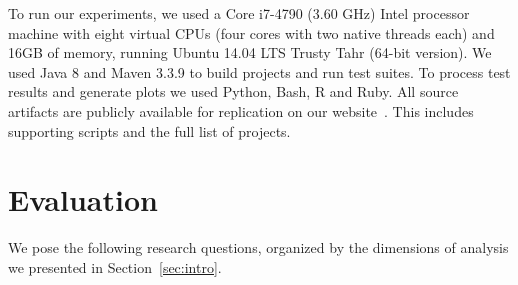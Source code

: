 \documentclass[10pt,journal,compsoc]{IEEEtran}
\begin{document}
\label{sec:setup}

To run our experiments, we used a Core i7-4790 (3.60 GHz) Intel processor
machine with eight virtual CPUs (four cores with two native threads each) and
16GB of memory, running Ubuntu 14.04 LTS Trusty Tahr (64-bit version).  We
used Java 8 and Maven 3.3.9 to build projects and run test
suites. To process test results and generate plots we used Python,
Bash, R and Ruby.  All source artifacts are publicly available for
replication on our website~\cite{ourwebpage}.  This includes supporting
scripts and the full list of projects.


\section{Evaluation}
\label{sec:eval}

We pose the following research questions, organized by the dimensions
of analysis we presented in Section~\ref{sec:intro}.

\newcommand{\numRQFeasibilityOne}{RQ1}
\newcommand{\RQFeasibilityOne}{How prevalent are time-consuming
  test suites\Comment{ in open-source projects}?}

\newcommand{\numRQFeasibilityTwo}{RQ2}
\newcommand{\RQFeasibilityTwo}{How is time distributed across test cases?}

\newcommand{\numRQAdoptionOne}{RQ3}
\newcommand{\RQAdoptionOne}{How popular is test suite
  parallelization\Comment{ in open-source projects}?}

\newcommand{\numRQAdoptionTwo}{RQ4}
\newcommand{\RQAdoptionTwo}{What are the main reasons that prevent developers
  from using test suite parallelization?}

\newcommand{\numRQSpeedupOne}{RQ5}
\newcommand{\RQSpeedupOne}{What are the speedups obtained with parallelization
  (in projects that actually use it)?}

\newcommand{\numRQSpeedupTwo}{RQ6}
\newcommand{\RQSpeedupTwo}{How test execution scales with the number of
  available CPUs?}

\newcommand{\numRQIssuesOne}{RQ7}
\newcommand{\RQIssuesOne}{How parallel execution configurations affect testing
  costs and flakiness?}
\end{document}
